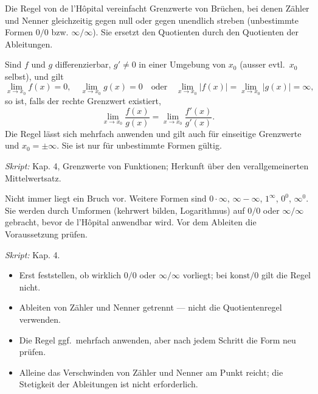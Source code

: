 

Die Regel von de l'Hôpital vereinfacht Grenzwerte von Brüchen, bei denen Zähler
und Nenner gleichzeitig gegen null oder gegen unendlich streben
(unbestimmte Formen $0/0$ bzw. $\infty/\infty$). Sie ersetzt den Quotienten
durch den Quotienten der Ableitungen.

\begin{werkzeugkasten}
Sind $f$ und $g$ differenzierbar, $g'\neq 0$ in einer Umgebung von $x_0$
(ausser evtl.\ $x_0$ selbst), und gilt
\begin{equation}
  \lim_{x\to x_0}f(x)=0,\quad \lim_{x\to x_0}g(x)=0
  \quad\text{oder}\quad
  \lim_{x\to x_0}|f(x)|=\lim_{x\to x_0}|g(x)|=\infty,
\end{equation}
so ist, falls der rechte Grenzwert existiert,
\begin{equation}
  \lim_{x\to x_0}\frac{f(x)}{g(x)}
  =\lim_{x\to x_0}\frac{f'(x)}{g'(x)}.
\end{equation}
Die Regel lässt sich mehrfach anwenden und gilt auch für einseitige
Grenzwerte und $x_0=\pm\infty$. Sie ist nur für unbestimmte Formen gültig.

\textit{Skript:} Kap. 4, Grenzwerte von Funktionen; Herkunft über den
verallgemeinerten Mittelwertsatz.
\end{werkzeugkasten}

\begin{werkzeugkasten}
Nicht immer liegt ein Bruch vor. Weitere Formen sind $0\cdot\infty$,
$\infty-\infty$, $1^\infty$, $0^0$, $\infty^0$. Sie werden durch Umformen
(kehrwert bilden, Logarithmus) auf $0/0$ oder $\infty/\infty$ gebracht, bevor
de l'Hôpital anwendbar wird. Vor dem Ableiten die Voraussetzung prüfen.

\textit{Skript:} Kap. 4.
\end{werkzeugkasten}

\begin{achtung}[Wichtig]
\begin{itemize}
  \item Erst feststellen, ob wirklich $0/0$ oder $\infty/\infty$ vorliegt;
        bei $\text{konst}/0$ gilt die Regel nicht.
  \item Ableiten von Zähler und Nenner getrennt — nicht die
        Quotientenregel verwenden.
  \item Die Regel ggf.\ mehrfach anwenden, aber nach jedem Schritt die Form
        neu prüfen.
  \item Alleine das Verschwinden von Zähler und Nenner am Punkt reicht; die
        Stetigkeit der Ableitungen ist nicht erforderlich.
\end{itemize}
\end{achtung}
